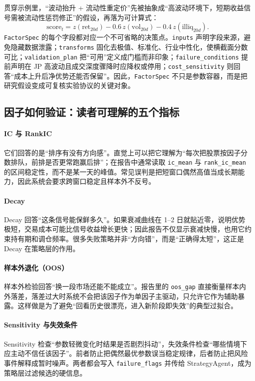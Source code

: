 \documentclass{article}
\newcommand{\tok}[1]{\nolinkurl{#1}}
\begin{document}
贯穿示例里，“波动抬升 + 流动性重定价”先被抽象成“高波动环境下，短期收益信号需被流动性惩罚修正”的假设，再落为可计算式：
\[
\mathrm{score}_t=z(\mathrm{ret}_{20d})-0.6\,z(\mathrm{vol}_{20d})-0.4\,z(\mathrm{illiq}_{20d}) .
\]
\tok{FactorSpec} 的每个字段都对应一个不可省略的决策点。\tok{inputs} 声明字段来源，避免隐藏数据泄露；\tok{transforms} 固化去极值、标准化、行业中性化，使横截面分数可比；\tok{validation_plan} 把“可用”定义成门槛而非印象；\tok{failure_conditions} 提前声明在 JP 高波动且成交深度骤降时应降权或停用；\tok{cost_sensitivity} 则回答“成本上升后净优势还能否保留”。因此，\tok{FactorSpec} 不只是参数容器，而是把研究假设变成可复核实验协议的关键对象。

\subsection{因子如何验证：读者可理解的五个指标}
\paragraph{IC 与 RankIC}
它们回答的是“排序有没有方向感”。直觉上可以把它理解为“每次把股票按因子分数排队，前排是否更常跑赢后排”；在报告中通常读取 \tok{ic_mean} 与 \tok{rank_ic_mean} 的区间稳定性，而不是某一天的峰值。常见误判是把短窗口偶然高值当成长期能力，因此系统会要求跨窗口稳定且样本外不反号。

\paragraph{Decay}
Decay 回答“这条信号能保鲜多久”。如果衰减曲线在 1--2 日就贴近零，说明优势极短，交易成本可能比信号收益增长更快；因此报告不仅显示衰减快慢，也用它约束持有期和调仓频率。很多失败策略并非“方向错”，而是“正确得太短”，这正是 Decay 在策略层的作用。

\paragraph{样本外退化（OOS）}
样本外检验回答“换一段市场还能不能成立”。报告里的 \tok{oos_gap} 直接衡量样本内外落差，落差过大时系统不会把该因子作为单因子主驱动，只允许它作为辅助暴露。这样做是为了避免“回看历史很漂亮，进入新阶段即失效”的典型过拟合。

\paragraph{Sensitivity 与失效条件}
Sensitivity 检查“参数轻微变化时结果是否剧烈抖动”，失效条件检查“哪些情境下应主动不信任该因子”。前者防止把偶然最优参数误当稳定规律，后者防止把风险事件解释成暂时噪声。两者都会写入 \tok{failure_flags} 并传给 StrategyAgent，成为策略层过滤候选的硬信息。
\end{document}
